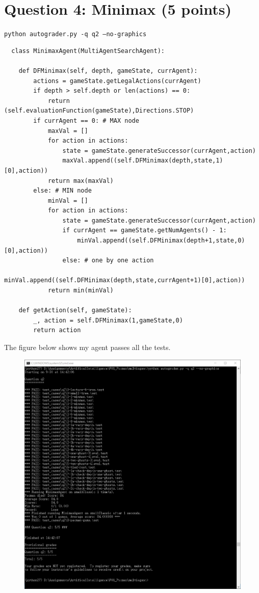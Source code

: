 \documentclass[a4paper, 11pt]{article}
\begin{document}
\section{Question 4: Minimax (5 points)}
\texttt{python autograder.py -q q2 --no-graphics}
\begin{lstlisting}
  class MinimaxAgent(MultiAgentSearchAgent):

    def DFMinimax(self, depth, gameState, currAgent):
        actions = gameState.getLegalActions(currAgent)
        if depth > self.depth or len(actions) == 0:
            return (self.evaluationFunction(gameState),Directions.STOP)
        if currAgent == 0: # MAX node
            maxVal = []
            for action in actions:
                state = gameState.generateSuccessor(currAgent,action)
                maxVal.append((self.DFMinimax(depth,state,1)[0],action))
            return max(maxVal)
        else: # MIN node
            minVal = []
            for action in actions:
                state = gameState.generateSuccessor(currAgent,action)
                if currAgent == gameState.getNumAgents() - 1:
                    minVal.append((self.DFMinimax(depth+1,state,0)[0],action))
                else: # one by one action
                    minVal.append((self.DFMinimax(depth,state,currAgent+1)[0],action))
            return min(minVal)

    def getAction(self, gameState):
        _, action = self.DFMinimax(1,gameState,0)
        return action
\end{lstlisting}

The figure below shows my agent passes all the tests.
\begin{figure}[H]
  \centering
  \includegraphics[width=\linewidth]{fig/Q4.png}
\end{figure}
\end{document}
